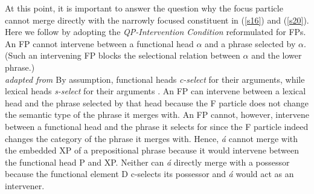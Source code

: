 \documentclass[output=paper,
modfonts
]{langscibook}
\begin{document}
At this point, it is important to answer the question why the focus particle cannot merge directly with the narrowly focused constituent in (\ref{s16}) and (\ref{s20}). Here we follow \citet{Cable2010} by adopting the {\em QP-Intervention Condition} reformulated for FPs.
\label{s21}\\
An FP cannot intervene between a functional head $\alpha$ and a phrase selected by $\alpha$. (Such an intervening FP blocks the selectional relation between $\alpha$ and the lower phrase.) \\ \hspace*{0pt} \hfill {\em adapted from \citet[][57]{Cable2010}}
\z
By assumption, functional heads {\em c-select} for their arguments, while lexical heads {\em s-select} for their arguments \citep[][62]{Cable2010}. An FP can intervene between a lexical head and the phrase selected by that head because the F particle does not change the semantic type of the phrase it merges with. An FP cannot, however, intervene between a functional head and the phrase it selects for since the F particle indeed changes the category of the phrase it merges with. Hence, {\em \'a} cannot merge with the embedded XP of a prepositional phrase because it would intervene between the functional head P and XP. Neither can {\em \'a} directly merge with a possessor because the functional element D c-selects its possessor and {\em \'a} would act as an intervener.
\end{document}
